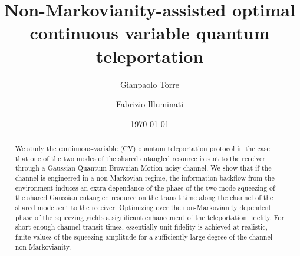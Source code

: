 \documentclass[prl,twocolumn,aps,floatfix,showpacs,tightenlines,superscriptaddress,amsmath,amssymb,amsfonts,10pt]{revtex4-1}
\begin{document}
\title{Non-Markovianity-assisted optimal continuous variable quantum teleportation}

\author{Gianpaolo Torre}


\author{Fabrizio Illuminati}



\date{\today}

\begin{abstract}
We study the continuous-variable (CV) quantum teleportation protocol in the case that one of the two modes of the shared entangled resource is sent to the receiver through a Gaussian Quantum Brownian Motion noisy channel. We show that if the channel is engineered in a non-Markovian regime, the information backflow from the environment induces an extra dependance of the phase of the two-mode squeezing of the shared Gaussian entangled resource on the transit time along the channel of the shared mode sent to the receiver. Optimizing over the non-Markovianity dependent phase of the squeezing yields a significant enhancement of the teleportation fidelity. For short enough channel transit times, essentially unit fidelity is achieved at realistic, finite values of the squeezing amplitude for a sufficiently large degree of the channel non-Markovianity.
\end{abstract}


\maketitle
\end{document}
